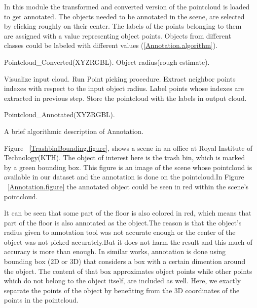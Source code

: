 In this module the transformed and converted version of the pointcloud is loaded to get annotated. 
The objects needed to be annotated in the scene, are selected by clicking roughly on their center. 
The labels of the points belonging to them are assigned with a value representing object points. 
Objects from different classes could be labeled with different values (\ref{Annotation.algorithm}).

\begin{algorithm}[t]
\begin{algorithmic}[1]
\REQUIRE Pointcloud\_Converted(XYZRGBL).
\REQUIRE Object radius(rough estimate).
\medskip

\STATE Visualize input cloud.
  \STATE Run Point picking procedure.
  \STATE Extract neighbor points indexes with respect to the input object radius.
  \STATE Label points whose indexes are extracted in previous step.
\ENDFOR
\STATE Store the pointcloud with the labels in output cloud.

\medskip
\ENSURE Pointcloud\_Annotated(XYZRGBL).
\end{algorithmic}
\caption[Annotation.]
{A brief algorithmic description of Annotation.}
\label{Annotation.algorithm}
\end{algorithm}


Figure ~\ref{TrashbinBounding.figure}, shows a scene in an office at Royal Institute of Technology(KTH). 
The object of interest here is the trash bin, which is marked by a green bounding box. 
This figure is an image of the scene whose pointcloud is available in our dataset and the annotation is done on 
the pointcloud.In Figure ~\ref{Annotation.figure} the annotated object could be seen in red within the scene's pointcloud.


It can be seen that some part of the floor is also colored in red, which means that part of the floor is also 
annotated as the object.The reason is that the object's radius given to annotation tool was not accurate enough or the center of the 
object was not picked accurately.But it does not harm the result and this much of accuracy is more than enough.
In similar works, annotation is done using bounding box (2D or 3D) that considers a box with a certain dimention around the object. The content of that box approximates object points while other points which do not belong to the object itself, are included as well.
Here, we exactly separate the points of the object by benefiting from the 3D coordinates of the points in the 
pointcloud.


